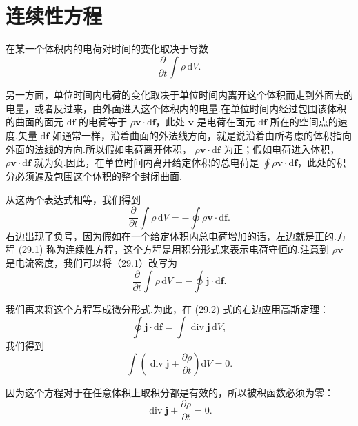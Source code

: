 \section{连续性方程}

在某一个体积内的电荷对时间的变化取决于导数
\begin{equation*}
  \frac{\partial}{\partial t}\int\rho\,\mathrm{d}V.
\end{equation*}

另一方面，单位时间内电荷的变化取决于单位时间内离开这个体积而走到外面去的电量，或者反过来，由外面进入这个体积内的电量.在单位时间内经过包围该体积的曲面的面元
$\mathrm{d}\boldsymbol{f}$ 的电荷等于 $\rho\boldsymbol{v}\cdot\mathrm{d}\boldsymbol{f}$，此处
$\boldsymbol{v}$ 是电荷在面元 $\mathrm{d}\boldsymbol{f}$
所在的空间点的速度.矢量 $\mathrm{d}\boldsymbol{f}$
如通常一样，沿着曲面的外法线方向，就是说沿着由所考虑的体积指向外面的法线的方向.所以假如电荷离开体积，
$\rho\boldsymbol{v}\cdot\mathrm{d}\boldsymbol{f}$ 为正；假如电荷进入体积，
$\rho\boldsymbol{v}\cdot\mathrm{d}\boldsymbol{f}$
就为负.因此，在单位时间内离开给定体积的总电荷是
$\oint\rho\boldsymbol{v}\cdot\mathrm{d}\boldsymbol{f}$，此处的积分必须遍及包围这个体积的整个封闭曲面.

从这两个表达式相等，我们得到
\begin{equation}
  \frac{\partial}{\partial t}\int\rho\,\mathrm{d}V
  =-\oint\rho\boldsymbol{v}\cdot\mathrm{d}\boldsymbol{f}.
\end{equation}
右边出现了负号，因为假如在一个给定体积内总电荷增加的话，左边就是正的.方程
(29.1) 称为连续性方程，这个方程是用积分形式来表示电荷守恒的.注意到 $\rho\boldsymbol{v}$
是电流密度，我们可以将（29.1）改写为
\begin{equation}
  \frac{\partial}{\partial t}\int\rho\,\mathrm{d}V
  =-\oint\boldsymbol{j}\cdot\mathrm{d}\boldsymbol{f}.
\end{equation}

我们再来将这个方程写成微分形式.为此，在 (29.2) 式的右边应用高斯定理：
\begin{equation*}
  \oint\boldsymbol{j}\cdot\mathrm{d}\boldsymbol{f}
  =\int\operatorname{div}\boldsymbol{j}\,\mathrm{d}V,
\end{equation*}
我们得到
\begin{equation*}
  \int\left(\operatorname{div}\boldsymbol{j}
  +\frac{\partial\rho}{\partial t}\right)\mathrm{d}V=0.
\end{equation*}

因为这个方程对于在任意体积上取积分都是有效的，所以被积函数必须为零：
\begin{equation}
  \operatorname{div}\boldsymbol{j}+\frac{\partial\rho}{\partial t}=0.
\end{equation}

